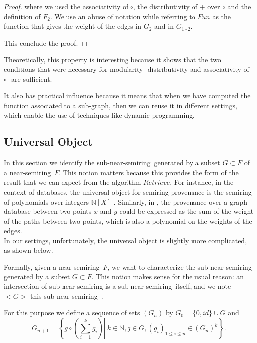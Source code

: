 \documentclass[11pt,a4paper]{article}
\newcommand{\bb}[1]{\mathbb{#1}}
\newcommand{\N}{\bb{N}}
\newcommand{\Ns}{near-semiring}
\newcommand{\sns}{sub-near-semiring}
\theoremstyle{definition}
\renewcommand{\leq}{\leqslant}
\begin{document}
\begin{proof}
	where we used the associativity of $\circ$, the distributivity of $+$ over $\circ$ and the definition of $F_2$. We use an abuse of notation while referring to $Fun$ as the function that gives the weight of the edges in $G_2$ and in $G_{1 \circ 2}$.
	
	This conclude the proof.
	
\end{proof}

	Theoretically, this property is interesting because it shows that the two conditions that were necessary for modularity -distributivity and associativity of $\circ$- are sufficient.
	
	It also has practical influence because it means that when we have computed the function associated to a sub-graph, then we can reuse it in different settings, which enable the use of techniques like dynamic programming.


\subsection{Universal Object}

	In this section we identify the \sns\ generated by a subset $G \subset F$ of a \Ns\ $F$. This notion matters because this provides the form of the result that we can expect from the algorithm $Retrieve$. For instance, in the context of databases, the universal object for semiring provenance is the semiring of polynomials over integers $\N[X]$ .
	Similarly, in , the provenance over a graph database between two points $x$ and $y$ could be expressed as the sum of the weight of the paths between two points, which is also a polynomial on the weights of the edges.\\
	
	In our settings, unfortunately, the universal object is slightly more complicated, as shown below.

Formally, given a \Ns\ $F$, we want to characterize the sub-near-semiring generated by a subset $G \subset F$. This notion makes sense for the usual reason: an intersection of sub-near-semiring is a \sns\ itself, and we note $<G>$ this \sns\ .

For this purpose we define a sequence of sets $(G_n)$ by $G_0=\{0,id\} \cup G$ and 
$$G_{n+1} = \left\{ \left. g \circ \left( \overset{k}{\underset{i=1}{\sum}} g_i \right) \right| \ k \in \N, g \in G, (g_i)_{1 \leq i \leq n} \in (G_n)^k \right\} .$$
\end{document}
